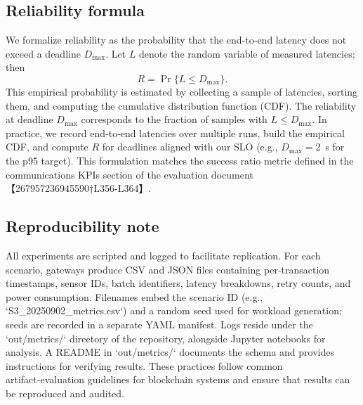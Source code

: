 \subsection{Reliability formula}
\label{sec:reliability-formula}
We formalize reliability as the probability that the end‑to‑end latency does not exceed a deadline $D_{\max}$.  Let $L$ denote the random variable of measured latencies; then
\begin{equation}
  R = \Pr\{L \le D_{\max}\}.
\end{equation}
This empirical probability is estimated by collecting a sample of latencies, sorting them, and computing the cumulative distribution function (CDF).  The reliability at deadline $D_{\max}$ corresponds to the fraction of samples with $L \le D_{\max}$.  In practice, we record end‑to‑end latencies over multiple runs, build the empirical CDF, and compute $R$ for deadlines aligned with our SLO (e.g., $D_{\max}=2$~s for the p95 target).  This formulation matches the success ratio metric defined in the communications KPIs section of the evaluation document【267957236945590†L356-L364】.

\subsection{Reproducibility note}
\label{sec:reproducibility}
All experiments are scripted and logged to facilitate replication.  For each scenario, gateways produce CSV and JSON files containing per‑transaction timestamps, sensor IDs, batch identifiers, latency breakdowns, retry counts, and power consumption.  Filenames embed the scenario ID (e.g., `S3_20250902_metrics.csv`) and a random seed used for workload generation; seeds are recorded in a separate YAML manifest.  Logs reside under the `out/metrics/` directory of the repository, alongside Jupyter notebooks for analysis.  A README in `out/metrics/` documents the schema and provides instructions for verifying results.  These practices follow common artifact‑evaluation guidelines for blockchain systems and ensure that results can be reproduced and audited.

